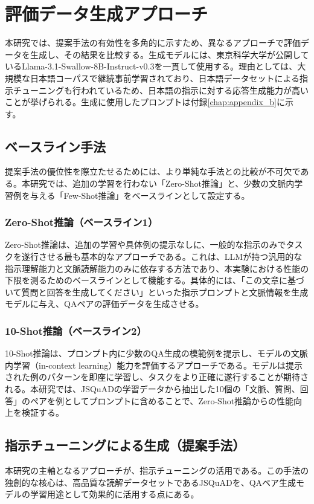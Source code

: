 \documentclass[a4paper,11pt]{jreport}
\begin{document}
\section{評価データ生成アプローチ}
本研究では、提案手法の有効性を多角的に示すため、異なるアプローチで評価データを生成し、その結果を比較する。生成モデルには、東京科学大学が公開しているLlama-3.1-Swallow-8B-Instruct-v0.3\cite{Fujii:COLM2024}を一貫して使用する。理由としては、大規模な日本語コーパスで継続事前学習されており、日本語データセットによる指示チューニングも行われているため、日本語の指示に対する応答生成能力が高いことが挙げられる。生成に使用したプロンプトは付録\ref{chap:appendix_b}に示す。

\subsection{ベースライン手法}
提案手法の優位性を際立たせるためには、より単純な手法との比較が不可欠である。本研究では、追加の学習を行わない「Zero-Shot推論」と、少数の文脈内学習例を与える「Few-Shot推論」をベースラインとして設定する。

\subsubsection{Zero-Shot推論（ベースライン1）}
Zero-Shot推論は、追加の学習や具体例の提示なしに、一般的な指示のみでタスクを遂行させる最も基本的なアプローチである。これは、LLMが持つ汎用的な指示理解能力と文脈読解能力のみに依存する方法であり、本実験における性能の下限を測るためのベースラインとして機能する。具体的には、「この文章に基づいて質問と回答を生成してください」といった指示プロンプトと文脈情報を生成モデルに与え、QAペアの評価データを生成させる。

\subsubsection{10-Shot推論（ベースライン2）}
10-Shot推論は、プロンプト内に少数のQA生成の模範例を提示し、モデルの文脈内学習（in-context learning）能力を評価するアプローチである。モデルは提示された例のパターンを即座に学習し、タスクをより正確に遂行することが期待される。本研究では、JSQuADの学習データから抽出した10個の「文脈、質問、回答」のペアを例としてプロンプトに含めることで、Zero-Shot推論からの性能向上を検証する。

\subsection{指示チューニングによる生成（提案手法）}
本研究の主軸となるアプローチが、指示チューニング\cite{Instruction-Tuning}の活用である。この手法の独創的な核心は、高品質な読解データセットであるJSQuAD\cite{JSQuAD}を、QAペア生成モデルの学習用途として効果的に活用する点にある。
\end{document}
